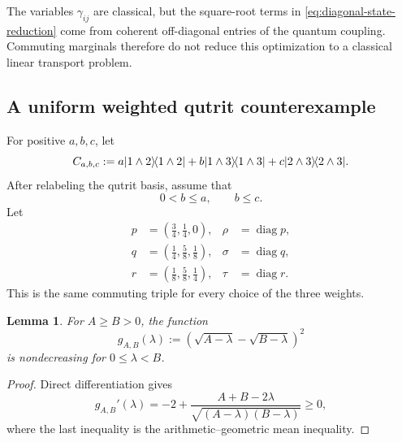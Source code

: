 \documentclass[11pt]{article}
\newtheorem{lemma}[theorem]{Lemma}
\newcommand{\ketbra}[2]{\ensuremath{\ket{#1}\!\bra{#2}}}
\DeclarePairedDelimiter\ket{\lvert}{\rangle}
\DeclarePairedDelimiter\bra{\langle}{\rvert}
\newcommand{\diag} {\operatorname{diag}}
\begin{document}
The variables $\gamma_{ij}$ are classical, but the square-root terms in
\eqref{eq:diagonal-state-reduction} come from coherent off-diagonal entries
of the quantum coupling.  Commuting marginals therefore do not reduce this
optimization to a classical linear transport problem.

\subsection{A uniform weighted qutrit counterexample}

For positive $a,b,c$, let
\begin{equation}\label{eq:weighted-qutrit-cost}
    C_{a,b,c}
    :=a\ketbra{1\wedge2}{1\wedge2}
      +b\ketbra{1\wedge3}{1\wedge3}
      +c\ketbra{2\wedge3}{2\wedge3}.
\end{equation}
After relabeling the qutrit basis, assume that
\begin{equation}\label{eq:minimum-weight}
    0<b\leq a,
    \qquad
    b\leq c.
\end{equation}
Let
\begin{equation}\label{eq:qutrit-triple}
    \begin{aligned}
        p&=\left(\frac34,\frac14,0\right),
        &\rho&=\diag p,\\
        q&=\left(\frac14,\frac58,\frac18\right),
        &\sigma&=\diag q,\\
        r&=\left(\frac18,\frac58,\frac14\right),
        &\tau&=\diag r.
    \end{aligned}
\end{equation}
This is the same commuting triple for every choice of the three weights.

\begin{lemma}\label{lem:square-root-monotonicity}
    For $A\geq B>0$, the function
    \[
        g_{A,B}(\lambda)
        :=\left(\sqrt{A-\lambda}-\sqrt{B-\lambda}\right)^2
    \]
    is nondecreasing for $0\leq\lambda<B$.
\end{lemma}

\begin{proof}
    Direct differentiation gives
    \[
        g_{A,B}'(\lambda)
        =-2+\frac{A+B-2\lambda}
        {\sqrt{(A-\lambda)(B-\lambda)}}\geq0,
    \]
    where the last inequality is the arithmetic--geometric mean
    inequality.
\end{proof}
\end{document}
